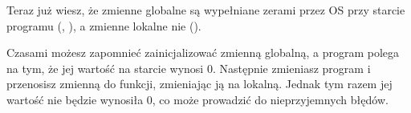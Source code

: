 
Teraz już wiesz, że zmienne globalne są wypełniane zerami przez \ac{OS} przy starcie programu
(, ), a zmienne lokalne nie ().

Czasami możesz zapomnieć zainicjalizować zmienną globalną, a program polega na tym, że jej wartość na starcie wynosi 0.
Następnie zmieniasz program i przenosisz zmienną do funkcji, zmieniając ją na lokalną.
Jednak tym razem jej wartość nie będzie wynosiła 0, co może prowadzić do nieprzyjemnych błędów.
